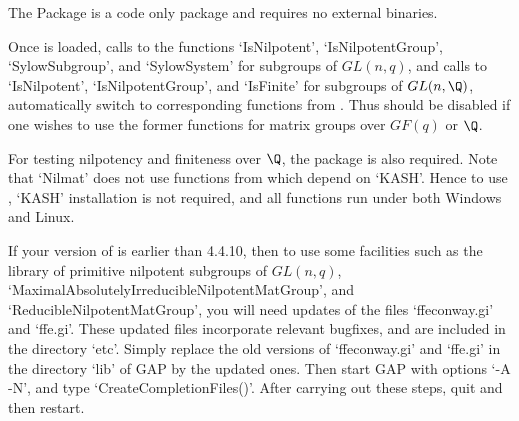 

The Package  is a {\GAP} code only package and requires
no external binaries.

Once  is loaded, calls to the {\GAP} functions
`IsNilpotent', `IsNilpotentGroup', `SylowSubgroup', and
`SylowSystem' for subgroups of $GL(n,q)$, and calls to
`IsNilpotent', `IsNilpotentGroup', and `IsFinite' for subgroups of
$GL(n,\Q)$, automatically switch to corresponding functions
from . Thus  should be disabled if
one wishes to use the former {\GAP} functions for matrix groups
over $GF(q)$ or $\Q$.

For testing nilpotency and finiteness over $\Q$, the {\GAP}
package  is also required. Note that `Nilmat'
does not use functions from  which depend on
`KASH'. Hence to use , `KASH' installation is not
required, and all  functions run under both
Windows and Linux.

If your version of {\GAP} is earlier than {\GAP} 4.4.10, then to
use some  facilities such as the library of
primitive nilpotent subgroups of $GL(n,q)$,
`MaximalAbsolutelyIrreducibleNilpotentMatGroup', and
`ReducibleNilpotentMatGroup', you will need updates of the files
`ffeconway.gi' and `ffe.gi'. These updated files incorporate
relevant bugfixes, and  are included in the 
directory `etc'. Simply replace the old versions of `ffeconway.gi'
and `ffe.gi' in the directory `lib' of {\sf GAP} by the updated
ones. Then start {\sf GAP} with options `-A -N', and type
`CreateCompletionFiles()'. After carrying out these steps, quit
{\GAP} and then restart.
